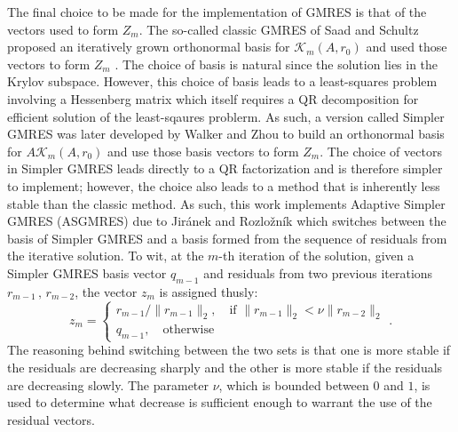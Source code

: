\documentclass[12pt]{UWMadThesis}
\begin{document}
The final choice to be made for the implementation of GMRES is that of the vectors used to form $Z_m$.
The so-called classic GMRES of Saad and Schultz proposed an iteratively grown orthonormal basis for $\mathcal{K}_m(A,r_0)$ and used those vectors to form $Z_m$ \cite{saad_gmres_1986}.
The choice of basis is natural since the solution lies in the Krylov subspace.
However, this choice of basis leads to a least-squares problem involving a Hessenberg matrix which itself requires a QR decomposition for efficient solution of the least-sqaures problerm.
As such, a version called Simpler GMRES was later developed by Walker and Zhou to build an orthonormal basis for $A\mathcal{K}_m(A,r_0)$ and use those basis vectors to form $Z_m$.
The choice of vectors in Simpler GMRES leads directly to a QR factorization and is therefore simpler to implement; however, the choice also leads to a method that is inherently less stable than the classic method.
As such, this work implements Adaptive Simpler GMRES (ASGMRES) due to Jir\'{a}nek and Rozlo\v{z}n\'{i}k which switches between the basis of Simpler GMRES and a basis formed from the sequence of residuals from the iterative solution.
To wit, at the $m$-th iteration of the solution, given a Simpler GMRES basis vector $q_{m-1}$ and residuals from two previous iterations ${r_{m-1}\,,\,r_{m-2}}$, the vector $z_m$ is assigned thusly:
\begin{equation}
    z_m =
    \begin{cases}
        r_{m-1}/\|r_{m-1}\|_2,\quad\text{if } \|r_{m-1}\|_2 < \nu\|r_{m-2}\|_2 \\
        q_{m-1},\quad\text{otherwise}
    \end{cases}.
\end{equation}
The reasoning behind switching between the two sets is that one is more stable if the residuals are decreasing sharply and the other is more stable if the residuals are decreasing slowly.
The parameter $\nu$, which is bounded between $0$ and $1$, is used to determine what decrease is sufficient enough to warrant the use of the residual vectors.
\end{document}
